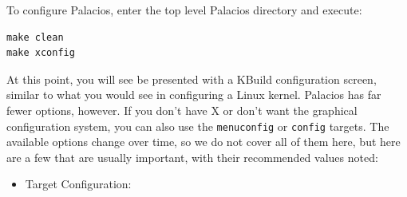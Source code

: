 \documentclass[11pt]{article}
\begin{document}
To configure Palacios, enter the top level Palacios directory and
execute:
\begin{verbatim}
make clean
make xconfig
\end{verbatim}
At this point, you will see be presented with a KBuild configuration
screen, similar to what you would see in configuring a Linux kernel.
Palacios has far fewer options, however.   If you don't have X or
don't want the graphical configuration system, you can also use the
\verb.menuconfig. or \verb.config. targets.  The available options
change over time, so we do not cover all of them here, but here are a
few that are usually important, with their recommended values noted:
\begin{itemize}
\item Target Configuration:   
\begin{itemize}


\end{itemize}
\end{itemize}
\end{document}
